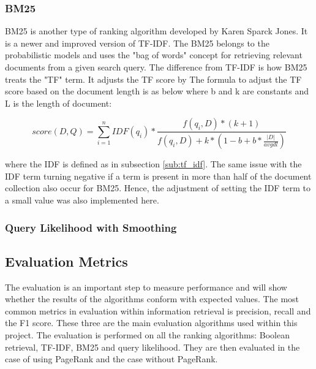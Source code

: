 
\subsubsection{BM25} %
\label{ssub:BM25}

BM25 is another type of ranking algorithm developed by Karen Sparck Jones. It is a newer and improved version of TF-IDF. The BM25 belongs to the probabilistic models and uses the "bag of words" concept for retrieving relevant documents from a given search query. The difference from TF-IDF is how BM25 treats the "TF" term. It adjusts the TF score by The formula to adjust the TF score based on the document length is as below where b and k are constants and L is the length of document:

$$ score(D, Q) = \sum_{i=1}^n IDF(q_i) * \frac{f(q_i, D)* (k + 1)}{f(q_i, D) + k * (1-b + b * \frac{|D|}{avgdl})}$$

where the IDF is defined as in subsection \ref{sub:tf_idf}. The same issue with the IDF term turning negative if a term is present in more than half of the document collection also occur for BM25. Hence, the adjustment of setting the IDF term to a small value was also implemented here.


\subsubsection{Query Likelihood with Smoothing} %
\label{ssub:query_likelihood_with_smoothing}



\subsection{Evaluation Metrics} %
\label{sub:metrics_&_analysis}

The evaluation is an important step to measure performance and will show whether the results of the algorithms conform with expected values. The most common metrics in evaluation within information retrieval is precision, recall and the F1 score. These three are the main evaluation algorithms used within this project. The evaluation is performed on all the ranking algorithms: Boolean retrieval, TF-IDF, BM25 and query likelihood. They are then evaluated in the case of using PageRank and the case without PageRank.

